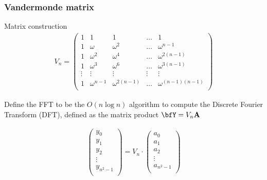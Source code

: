 \documentclass{beamer}
\begin{document}
\begin{frame}
  \frametitle{Vandermonde matrix}
  \begin{block}{Matrix construction}
  \begin{align*}
    V_{n} =
  \left(
  \begin{array}{rrrrr}
  1 & 1 & 1 & \dots & 1 \\
  1 & \omega & \omega^2 & \dots & \omega^{n-1} \\
  1 & \omega^2 & \omega^4 & \dots & \omega^{2(n-1)} \\
  1 & \omega^3 & \omega^6 & \dots & \omega^{3(n-1)} \\
  \vdots & \vdots & \vdots & \vdots & \vdots \\
  1 & \omega^{n-1} & \omega^{2(n-1)} & \dots & \omega^{(n-1)(n-1)} \\
  \end{array}
  \right)
  \end{align*}
  \end{block}
\end{frame}

\begin{frame}
  \begin{definition}
  Define the FFT to be the $O(n \log n)$
  algorithm to compute the Discrete Fourier Transform (DFT), defined
  as the matrix product $\bfY = V_{n} {\bf A}$
  \end{definition}

  \begin{align*}
  \left(
  \begin{array}{l}
  y_0 \\
  y_1 \\
  y_2 \\
  \vdots \\
  y_{n^2-1} \\
  \end{array}
  \right)
  = V_n \cdot
  \left(
  \begin{array}{l}
  a_0 \\
  a_1 \\
  a_2 \\
  \vdots \\
  a_{n^2-1} \\
  \end{array}
  \right)
  \end{align*}
\end{frame}
\end{document}

